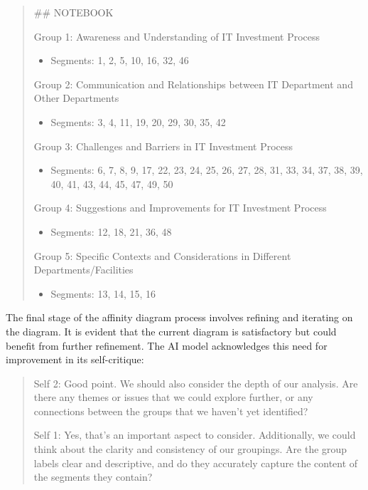 \documentclass[
]{book}
\providecommand{\tightlist}{%
  \setlength{\itemsep}{0pt}\setlength{\parskip}{0pt}}
\begin{document}
\begin{quote}
\#\# NOTEBOOK

Group 1: Awareness and Understanding of IT Investment Process

\begin{itemize}
\tightlist
\item
  Segments: 1, 2, 5, 10, 16, 32, 46
\end{itemize}

Group 2: Communication and Relationships between IT Department and Other Departments

\begin{itemize}
\tightlist
\item
  Segments: 3, 4, 11, 19, 20, 29, 30, 35, 42
\end{itemize}

Group 3: Challenges and Barriers in IT Investment Process

\begin{itemize}
\tightlist
\item
  Segments: 6, 7, 8, 9, 17, 22, 23, 24, 25, 26, 27, 28, 31, 33, 34, 37, 38, 39, 40, 41, 43, 44, 45, 47, 49, 50
\end{itemize}

Group 4: Suggestions and Improvements for IT Investment Process

\begin{itemize}
\tightlist
\item
  Segments: 12, 18, 21, 36, 48
\end{itemize}

Group 5: Specific Contexts and Considerations in Different Departments/Facilities

\begin{itemize}
\tightlist
\item
  Segments: 13, 14, 15, 16
\end{itemize}
\end{quote}

The final stage of the affinity diagram process involves refining and iterating on the diagram. It is evident that the current diagram is satisfactory but could benefit from further refinement. The AI model acknowledges this need for improvement in its self-critique:

\begin{quote}
Self 2: Good point. We should also consider the depth of our analysis. Are there any themes or issues that we could explore further, or any connections between the groups that we haven't yet identified?

Self 1: Yes, that's an important aspect to consider. Additionally, we could think about the clarity and consistency of our groupings. Are the group labels clear and descriptive, and do they accurately capture the content of the segments they contain?
\end{quote}
\end{document}
